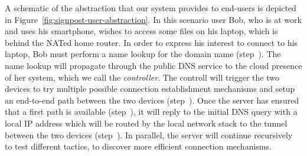 A schematic of the abstraction that our system provides to end-users is depicted
in Figure~\ref{fig:signpost-user-abstraction}. In this scenario user Bob, who is
at work and uses his smartphone, wishes to access some files on his laptop,
which is behind the NATed home router. In order to express his interest to
connect to his laptop, Bob must perform a name lookup for the domain name
 (step~). The name lookup will propagate through the public DNS service
to the cloud presence of her \signpost system, which we call the {\it \signpost
  controller}. The \signpost controll will trigger the two devices to try
multiple possible connection establishment mechanisms and setup an end-to-end
path between the two devices (step~). Once the server has ensured that a first path is
available (step~), it will reply to the initial DNS query with a local IP address which
will be routed by the local network stack to the tunnel between the two devices
(step~).
In parallel, the server will continue recursively to test different tactics, to
discover more efficient connection mechanisms. 




